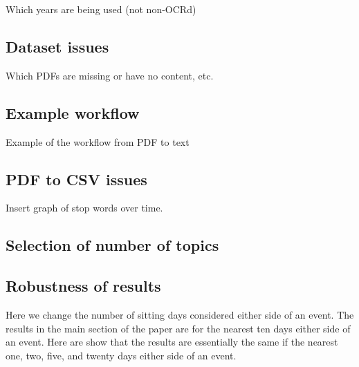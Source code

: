 \documentclass[12pt,]{article}
\theoremstyle{definition}
\theoremstyle{definition}
\theoremstyle{definition}
\theoremstyle{remark}
\begin{document}
Which years are being used (not non-OCRd)

\subsection{Dataset issues}\label{dataset-issues}

Which PDFs are missing or have no content, etc.

\subsection{Example workflow}\label{example-workflow}

Example of the workflow from PDF to text

\subsection{PDF to CSV issues}\label{pdf-to-csv-issues}

Insert graph of stop words over time.

\subsection{Selection of number of
topics}\label{selection-of-number-of-topics}

\subsection{Robustness of results}\label{robustness-of-results}

Here we change the number of sitting days considered either side of an
event. The results in the main section of the paper are for the nearest
ten days either side of an event. Here are show that the results are
essentially the same if the nearest one, two, five, and twenty days
either side of an event.

\newpage




\newpage
\singlespacing 
\renewcommand\refname{References}

\end{document}
